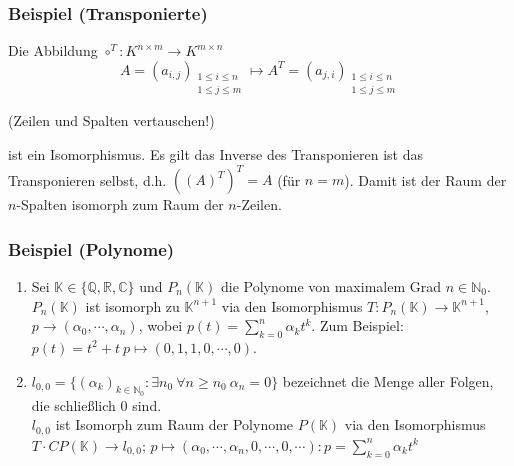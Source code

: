 \subsubsection{Beispiel (Transponierte)}
Die Abbildung $\circ ^T:K^{n\times m}\rightarrow K^{m\times n}$
\[ A=(a_{i,j})_{\substack{1\leq i\leq n\\ 1\leq j\leq m}} \mapsto A^T =(a_{j,i})_{\substack{1\leq i\leq n\\ 1\leq j\leq m}}\]
\begin{center}
(Zeilen und Spalten vertauschen!)
\end{center}
ist ein Isomorphismus.  Es gilt das Inverse des Transponieren ist das Transponieren selbst, d.h. $((A)^T)^T=A$ (für $n=m$).  Damit ist der Raum der $n$-Spalten isomorph zum Raum der $n$-Zeilen.
\subsubsection{Beispiel (Polynome)}
\renewcommand{\labelenumi}{(\arabic{enumi})}
\begin{enumerate}
\item Sei $\mathbb{K}\in \{\mathbb{Q},\mathbb{R},\mathbb{C}\}$ und $P_n(\mathbb{K})$ die Polynome von maximalem Grad $n\in \mathbb{N}_0$. $P_n(\mathbb{K})$ ist isomorph zu $\mathbb{K}^{n+1}$ via den Isomorphismus $T: P_n(\mathbb{K})\rightarrow \mathbb{K}^{n+1}$, $p\rightarrow (\alpha _0,\cdots ,\alpha _n)$, wobei $p(t)=\sum_{k=0}^n\alpha _kt^k$. Zum Beispiel: $p(t)=t^2+t\ p\mapsto (0,1,1, 0,\cdots ,0)$.
\item $l_{0,0}=\{(\alpha _k)_{k\in \mathbb{N}_0}:\exists n_0\ \forall n\geq n_0\ \alpha _n=0\}$ bezeichnet die Menge aller Folgen, die schließlich $0$ sind.\\
$l_{0,0}$ ist Isomorph zum Raum der Polynome $P(\mathbb{K})$ via den Isomorphismus $T\cdot C P(\mathbb{K})\rightarrow l_{0,0}$; $p\mapsto (\alpha _0,\cdots ,\alpha _n,0,\cdots, 0,\cdots ): p=\sum_{k=0}^n\alpha _kt^k$
\end{enumerate}
